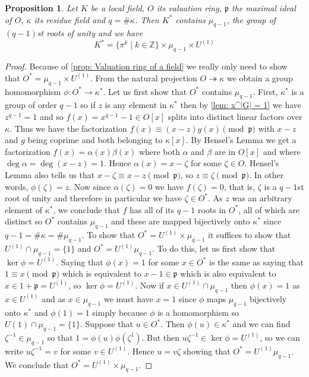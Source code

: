 \documentclass{article}
\newtheorem{proposition}{Proposition}[section]
\newcommand{\mfrak}[1]{\mathfrak{#1}}
\newcommand{\mbb}[1]{\mathbb{#1}}
\begin{document}
\begin{proposition}\label{prop: Factorization of elements in K^*}
    Let $K$ be a local field, $O$ its valuation ring, $\mfrak p$ the maximal ideal of $O$, $\kappa$ its residue field and $q = \#\kappa$. Then $K^*$ contains $\mu_{q-1}$, the group of $(q-1)$st roots of unity and we have
    $$K^* = \{\pi^k \mid k \in \mbb Z \} \times \mu_{q-1} \times U^{(1)}$$ 
\end{proposition}
\begin{proof}
    Because of \cref{prop: Valuation ring of a field} we really only need to show that $O^* = \mu_{q-1} \times U^{(1)}$. From the natural projection $O \twoheadrightarrow \kappa$ we obtain a group homomorphism $\phi : O^* \to \kappa^*$. Let us first show that $O^*$ contains $\mu_{q-1}$. First, $\kappa^*$ is a group of order $q-1$ so if $z$ is any element in $\kappa^*$ then by \cref{lem: x^|G| = 1} we have $z^{q-1} = 1$ and so $f(x) = x^{q-1} - 1 \in O[x]$ splits into distinct linear factors over $\kappa$. Thus we have the factorization $f(x) \equiv (x-z) g(x) \pmod {\mfrak p}$ with $x - z$ and $g$ being coprime and both belonging to $\kappa[x]$. By Hensel's Lemma we get a factorization $f(x) = \alpha(x)\beta(x)$ where both $\alpha$ and $\beta$ are in $O[x]$ and where $\deg \alpha = \deg (x - z) = 1$. Hence $\alpha(x) = x - \zeta$ for some $\zeta \in O$. Hensel's Lemma also tells us that $x - \zeta \equiv x - z \pmod {\mfrak p}$, so $z \equiv \zeta \pmod{\mfrak p}$. In other words, $\phi(\zeta) = z$. Now since $\alpha(\zeta) = 0$ we have $f(\zeta) = 0$, that is, $\zeta$ is a $q-1$st root of unity and therefore in particular we have $\zeta \in O^*$. As $z$ was an arbitrary element of $\kappa^*$, we conclude that $f$ has all of its $q-1$ roots in $O^*$, all of which are distinct so $O^*$ contains $\mu_{q-1}$ and these are mapped bijectively onto $\kappa^*$ since $q- 1 = \# \kappa = \# \mu_{q-1}$. To show that $O^* = U^{(1)} \times \mu_{q-1}$ it suffices to show that $U^{(1)}\cap \mu_{q-1} = \{1\}$ and  $O^* = U^{(1)}\mu_{q-1}$. To do this, let us first show that $\ker \phi = U^{(1)}$. Saying that $\phi(x) = 1$ for some $x \in O^*$ is the same as saying that $1 \equiv x \pmod{\mfrak p}$ which is equivalent to $x - 1 \in \mfrak p$ which is also equivalent to $x \in 1 + \mfrak p = U^{(1)}$, so $\ker \phi = U^{(1)}$. Now if $x \in U^{(1)} \cap \mu_{q-1}$ then $\phi(x) = 1$ as $x \in U^{(1)}$ and as $x \in \mu_{q-1}$ we must have $x = 1$ since $\phi$ maps $\mu_{q-1}$ bijectively onto $\kappa^*$ and $\phi(1) = 1$ simply because $\phi$ is a homomorphism so $U{(1)} \cap \mu_{q-1} = \{ 1 \}$. Suppose that $u \in O^*$. Then $\phi(u) \in \kappa^*$ and we can find $\zeta^{-1} \in \mu_{q-1}$ so that $1 = \phi(u)\phi(\zeta^{1})$. But then $u\zeta^{-1} \in \ker \phi = U^{(1)}$, so we can write $u\zeta^{-1} = v$ for some $v \in U^{(1)}$. Hence $u = v \zeta$ showing that $O^* = U^{(1)}\mu_{q-1}$. We conclude that $O^* = U^{(1)} \times \mu_{q-1}$.
\end{proof}
\end{document}
